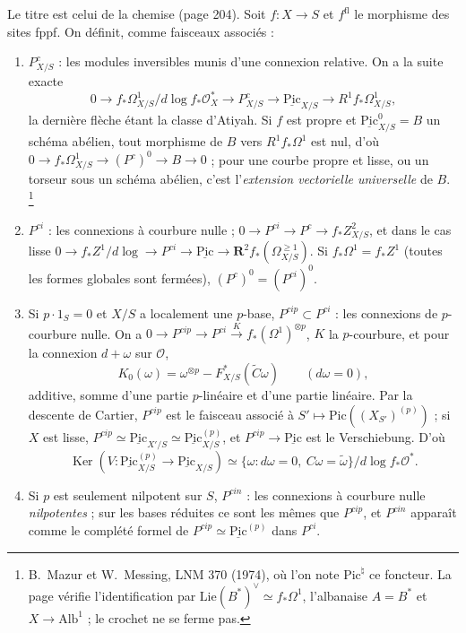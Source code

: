 \documentclass[11pt,a4paper]{article}
\begin{document}
Le titre est celui de la chemise (page 204). Soit $f : X \to S$ et
$f^{\mathrm{fl}}$ le morphisme des sites fppf. On définit, comme faisceaux
associés :
\begin{enumerate}
  \item[①] $P^c_{X/S}$ : les modules inversibles munis d'une connexion
  relative. On a la suite exacte
  \[
    0 \to f_*\Omega^1_{X/S}/d\log f_*\mathcal{O}_X^* \to P^c_{X/S} \to
    \underline{\mathrm{Pic}}_{X/S} \to R^1f_*\Omega^1_{X/S} ,
  \]
  la dernière flèche étant la classe d'Atiyah. Si $f$ est propre et
  $\underline{\mathrm{Pic}}^0_{X/S} = B$ un schéma abélien, tout morphisme de $B$
  vers $R^1f_*\Omega^1$ est nul, d'où $0 \to f_*\Omega^1_{X/S} \to (P^c)^0
  \to B \to 0$ ; pour une courbe propre et lisse, ou un torseur sous un schéma
  abélien, c'est l'\emph{extension vectorielle universelle} de $B$.
  \footnote{B.~Mazur et W.~Messing, LNM 370 (1974), où l'on note
  $\mathrm{Pic}^\natural$ ce foncteur. La page vérifie l'identification par
  $\mathrm{Lie}(B^*)^\vee \simeq f_*\Omega^1$, l'albanaise $A = B^*$ et
  $X \to \mathrm{Alb}^1$ ; le crochet ne se ferme pas.}
  \item[②] $P^{ci}$ : les connexions à courbure nulle ;
  $0 \to P^{ci} \to P^c \to f_*Z^2_{X/S}$, et dans le cas lisse
  $0 \to f_*Z^1/d\log \to P^{ci} \to \underline{\mathrm{Pic}} \to
  \mathbf{R}^2f_*(\Omega^{\geq 1}_{X/S})$. Si $f_*\Omega^1 = f_*Z^1$ (toutes les
  formes globales sont fermées), $(P^c)^0 = (P^{ci})^0$.
  \item[③] Si $p\cdot 1_S = 0 $ et $X/S$ a localement une $p$-base,
  $P^{cip} \subset P^{ci}$ : les connexions de $p$-courbure nulle. On a
  $0 \to P^{cip} \to P^{ci} \xrightarrow{K} f_*(\Omega^1)^{\otimes p}$, $K$ la
  $p$-courbure, et pour la connexion $d + \omega$ sur $\mathcal{O}$,
  \[
    K_0(\omega) = \omega^{\otimes p} - F^*_{X/S}(\widetilde C\omega)
    \qquad (d\omega = 0),
  \]
  additive, somme d'une partie $p$-linéaire et d'une partie linéaire. Par la
  descente de Cartier, $P^{cip}$ est le faisceau associé à $S' \mapsto
  \mathrm{Pic}((X_{S'})^{(p)})$ ; si $X$ est lisse, $P^{cip} \simeq
  \underline{\mathrm{Pic}}_{X'/S} \simeq \underline{\mathrm{Pic}}^{(p)}_{X/S}$, et
  $P^{cip} \to \underline{\mathrm{Pic}}$ est le Verschiebung. D'où
  \[
    \operatorname{Ker}(V : \underline{\mathrm{Pic}}^{(p)}_{X/S} \to
    \underline{\mathrm{Pic}}_{X/S}) \simeq
    \{\omega : d\omega = 0,\ C\omega = \tilde\omega\}/d\log f_*\mathcal{O}^* .
  \]
  \item[④] Si $p$ est seulement nilpotent sur $S$, $P^{cin}$ : les connexions
  à courbure nulle \emph{nilpotentes} ; sur les bases réduites ce sont les
  mêmes que $P^{cip}$, et $P^{cin}$ apparaît comme le complété formel de
  $P^{cip} \simeq \underline{\mathrm{Pic}}^{(p)}$ dans $P^{ci}$.
\end{enumerate}
\end{document}
